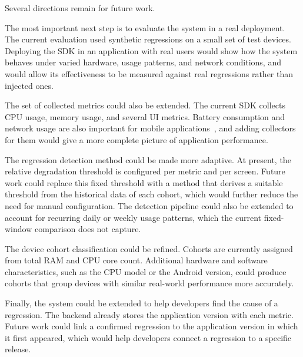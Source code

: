 Several directions remain for future work.

The most important next step is to evaluate the system in a real deployment. The current evaluation used synthetic regressions on a small set of test devices. Deploying the SDK in an application with real users would show how the system behaves under varied hardware, usage patterns, and network conditions, and would allow its effectiveness to be measured against real regressions rather than injected ones.

The set of collected metrics could also be extended. The current SDK collects CPU usage, memory usage, and several UI metrics. Battery consumption and network usage are also important for mobile applications~\cite{Saraiva}, and adding collectors for them would give a more complete picture of application performance.

The regression detection method could be made more adaptive. At present, the relative degradation threshold is configured per metric and per screen. Future work could replace this fixed threshold with a method that derives a suitable threshold from the historical data of each cohort, which would further reduce the need for manual configuration. The detection pipeline could also be extended to account for recurring daily or weekly usage patterns, which the current fixed-window comparison does not capture.

The device cohort classification could be refined. Cohorts are currently assigned from total RAM and CPU core count. Additional hardware and software characteristics, such as the CPU model or the Android version, could produce cohorts that group devices with similar real-world performance more accurately.

Finally, the system could be extended to help developers find the cause of a regression. The backend already stores the application version with each metric. Future work could link a confirmed regression to the application version in which it first appeared, which would help developers connect a regression to a specific release.
